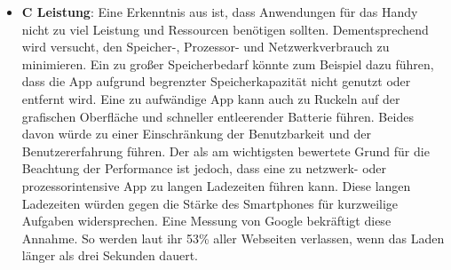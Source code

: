 \begin{itemize}
	\item \textbf{C Leistung}: %
		Eine Erkenntnis aus  ist, dass Anwendungen für das Handy nicht zu viel Leistung und Ressourcen benötigen sollten. %
		Dementsprechend wird versucht, den Speicher-, Prozessor- und Netzwerkverbrauch zu minimieren. %
			Ein zu großer Speicherbedarf könnte zum Beispiel dazu führen, dass die App aufgrund begrenzter Speicherkapazität nicht genutzt oder entfernt wird. %
			Eine zu aufwändige App kann auch zu Ruckeln auf der grafischen Oberfläche und schneller entleerender Batterie führen. Beides davon würde zu einer Einschränkung der Benutzbarkeit und der Benutzererfahrung führen. %
			Der als am wichtigsten bewertete Grund für die Beachtung der Performance ist jedoch, dass eine zu netzwerk- oder prozessorintensive App zu langen Ladezeiten führen kann. %
				Diese langen Ladezeiten würden gegen die Stärke des Smartphones für kurzweilige Aufgaben widersprechen. %
				Eine Messung von Google bekräftigt diese Annahme. So werden laut ihr 53\% aller Webseiten verlassen, wenn das Laden länger als drei Sekunden dauert\cite{pcVsphone_threeSeconds}.
	

\end{itemize}

